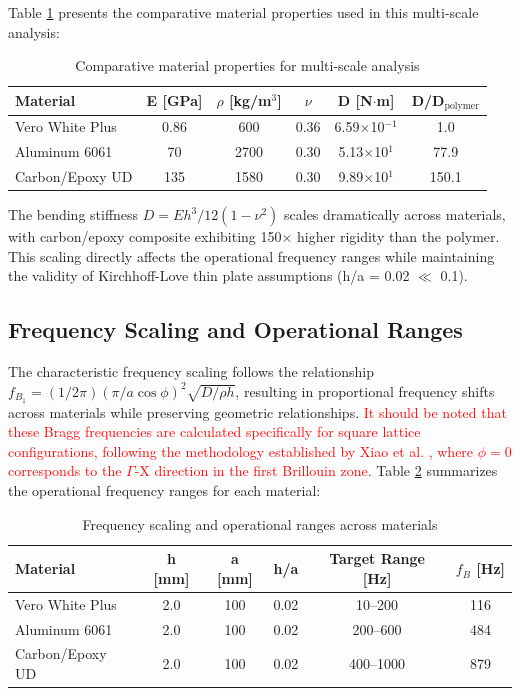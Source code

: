 \documentclass[review,numbers,sort&compress]{elsarticle}
\begin{document}
Table \ref{tab:material_properties_comparison} presents the comparative material properties used in this multi-scale analysis:

\begin{table}[!htb]
\centering
\caption{Comparative material properties for multi-scale analysis}
\label{tab:material_properties_comparison}
\small
\begin{tabular}{lccccc}
\hline
Material & E [GPa] & $\rho$ [kg/m$^3$] & $\nu$ & D [N$\cdot$m] & D/D$_{\text{polymer}}$ \\
\hline
Vero White Plus & 0.86 & 600 & 0.36 & 6.59$\times$10$^{-1}$ & 1.0 \\
Aluminum 6061 & 70 & 2700 & 0.30 & 5.13$\times$10$^{1}$ & 77.9 \\
Carbon/Epoxy UD & 135 & 1580 & 0.30 & 9.89$\times$10$^{1}$ & 150.1 \\
\hline
\end{tabular}
\end{table}

The bending stiffness $D = Eh^3/12(1-\nu^2)$ scales dramatically across materials, with carbon/epoxy composite exhibiting 150× higher rigidity than the polymer. This scaling directly affects the operational frequency ranges while maintaining the validity of Kirchhoff-Love thin plate assumptions (h/a = 0.02 $\ll$ 0.1).

\subsection{Frequency Scaling and Operational Ranges}

The characteristic frequency scaling follows the relationship $f_{B_1} = (1/2\pi)(\pi/a\cos\phi)^2 \sqrt{D/\rho h}$, resulting in proportional frequency shifts across materials while preserving geometric relationships. \textcolor{red}{It should be noted that these Bragg frequencies are calculated specifically for square lattice configurations, following the methodology established by Xiao et al. \cite{Xiao_2012}, where $\phi = 0$ corresponds to the $\Gamma$-X direction in the first Brillouin zone.} Table \ref{tab:frequency_scaling} summarizes the operational frequency ranges for each material:

\begin{table}[!htb]
\centering
\caption{Frequency scaling and operational ranges across materials}
\label{tab:frequency_scaling}
\small
\begin{tabular}{lccccc}
\hline
Material & h [mm] & a [mm] & h/a & Target Range [Hz] & $f_B$ [Hz] \\
\hline
Vero White Plus & 2.0 & 100 & 0.02 & 10--200 & 116 \\
Aluminum 6061 & 2.0 & 100 & 0.02 & 200--600 & 484 \\
Carbon/Epoxy UD & 2.0 & 100 & 0.02 & 400--1000 & 879 \\
\hline
\end{tabular}
\end{table}
\end{document}
